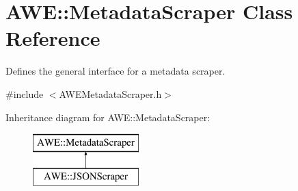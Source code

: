 \hypertarget{class_a_w_e_1_1_metadata_scraper}{\section{A\-W\-E\-:\-:Metadata\-Scraper Class Reference}
\label{class_a_w_e_1_1_metadata_scraper}
}


Defines the general interface for a metadata scraper.  




{\ttfamily \#include $<$A\-W\-E\-Metadata\-Scraper.\-h$>$}

Inheritance diagram for A\-W\-E\-:\-:Metadata\-Scraper\-:\begin{figure}[H]
\begin{center}
\leavevmode
\includegraphics[height=2.000000cm]{class_a_w_e_1_1_metadata_scraper}
\end{center}
\end{figure}
